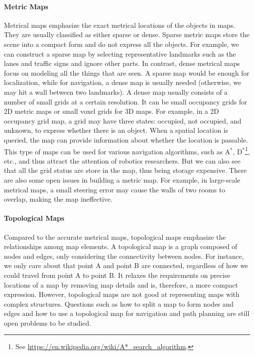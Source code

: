 \paragraph{Metric Maps}
Metrical maps emphasize the exact metrical locations of the objects in maps. They are usually classified as either sparse or dense. Sparse metric maps store the scene into a compact form and do not express all the objects. For example, we can construct a sparse map by selecting representative landmarks such as the lanes and traffic signs and ignore other parts. In contrast, dense metrical maps focus on modeling all the things that are seen. A sparse map would be enough for localization, while for navigation, a dense map is usually needed (otherwise, we may hit a wall between two landmarks). A dense map usually consists of a number of small grids at a certain resolution. It can be small occupancy grids for 2D metric maps or small voxel grids for 3D maps. For example, in a 2D occupancy grid map, a grid may have three states: occupied, not occupied, and unknown, to express whether there is an object. When a spatial location is queried, the map can provide information about whether the location is passable. This type of maps can be used for various navigation algorithms, such as A$^*$, D$^*$\footnote{ See \url{https://en.wikipedia.org/wiki/A*_search_algorithm}.}, etc., and thus attract the attention of robotics researchers. But we can also see that all the grid status are store in the map, thus being storage expensive. There are also some open issues in building a metric map. For example, in large-scale metrical maps, a small steering error may cause the walls of two rooms to overlap, making the map ineffective.

\paragraph{Topological Maps}
Compared to the accurate metrical maps, topological maps emphasize the relationships among map elements. A topological map is a graph composed of nodes and edges, only considering the connectivity between nodes. For instance, we only care about that point A and point B are connected, regardless of how we could travel from point A to point B. It relaxes the requirements on precise locations of a map by removing map details and is, therefore, a more compact expression. However, topological maps are not good at representing maps with complex structures. Questions such as how to split a map to form nodes and edges and how to use a topological map for navigation and path planning are still open problems to be studied.

